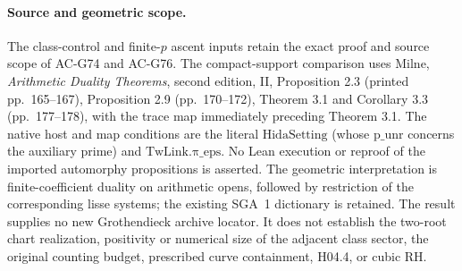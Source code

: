 \paragraph{Source and geometric scope.}
The class-control and finite-$p$ ascent inputs retain the exact
proof and source scope of AC-G74 and AC-G76.  The compact-support
comparison uses Milne, \emph{Arithmetic Duality Theorems}, second
edition, II, Proposition 2.3 (printed pp.~165--167), Proposition 2.9
(pp.~170--172), Theorem 3.1 and Corollary 3.3 (pp.~177--178),
with the trace map immediately preceding Theorem 3.1.
The native host and map conditions are the literal
 $\mathrm{HidaSetting}$ (whose
$\mathrm{p\_unr}$ concerns the auxiliary prime) and
 $\mathrm{TwLink.\pi\_eps}$.
No Lean execution or reproof of the imported automorphy propositions
is asserted.  The geometric interpretation is finite-coefficient
duality on arithmetic opens, followed by restriction of the
corresponding lisse systems; the existing SGA~1 dictionary is
retained.  The result supplies no new Grothendieck archive locator.
It does not establish the two-root chart realization, positivity
or numerical size of the adjacent class sector, the original
counting budget, prescribed curve containment, H04.4, or cubic RH.
